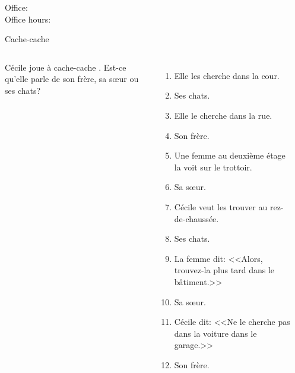 \documentclass{beamer}
\subtitle[Étages et objets directs]{Les étages et les pronoms compléments d'objet direct}
\begin{document}
  \begin{frame}
    \titlepage
    \tiny{Office: \\
          Office hours: }
  \end{frame}

  \begin{frame}{Cache-cache}
    \begin{columns}
        \scriptsize
        Cécile joue à cache-cache .
        Est-ce qu'elle parle de son frère, sa sœur ou ses chats?
        \begin{enumerate}
          \item Elle les cherche dans la cour.
          \item<2->[$\to$] Ses chats.
          \item<3-> Elle le cherche dans la rue.
          \item<4->[$\to$] Son frère.
          \item<5-> Une femme au deuxième étage la voit sur le trottoir.
          \item<6->[$\to$] Sa sœur.
          \item<7-> Cécile veut les trouver au rez-de-chaussée.
          \item<8->[$\to$] Ses chats.
          \item<9-> La femme dit: <<Alors, trouvez-la plus tard dans le bâtiment.>>
          \item<10->[$\to$] Sa sœur.
          \item<11-> Cécile dit: <<Ne le cherche pas dans la voiture dans le garage.>>
          \item<12->[$\to$] Son frère.
        \end{enumerate}
        \begin{minipage}[t][0.6\textheight]{\linewidth}
          \begin{center}
          \end{center}
        \end{minipage}
    \end{columns}
  \end{frame}
\end{document}
